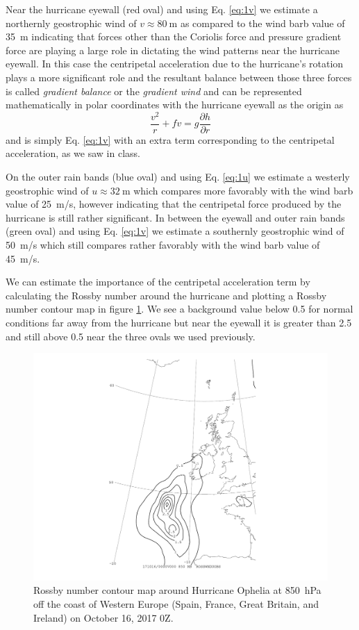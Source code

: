 \documentclass[11pt]{article}
\newcommand\p[2]{\frac{\partial #1}{\partial #2}}
\begin{document}
Near the hurricane eyewall (red oval) and using Eq. \ref{eq:1v} we estimate a northernly geostrophic wind of $v \approx \SI{80}{\m}$ as compared to the wind barb value of \SI{35}{\m} indicating that forces other than the Coriolis force and pressure gradient force are playing a large role in dictating the wind patterns near the hurricane eyewall. In this case the centripetal acceleration due to the hurricane's rotation plays a more significant role and the resultant balance between those three forces is called \emph{gradient balance} or the \emph{gradient wind} and can be represented mathematically in polar coordinates with the hurricane eyewall as the origin as
\begin{equation*}
	\frac{v^2}{r} + fv = g\p{h}{r}
\end{equation*}
and is simply Eq. \eqref{eq:1v} with an extra term corresponding to the centripetal acceleration, as we saw in class.

On the outer rain bands (blue oval) and using Eq. \ref{eq:1u} we estimate a westerly geostrophic wind of $u \approx \SI{32}{\m}$ which compares more favorably with the wind barb value of \SI{25}{\m/\s}, however indicating that the centripetal force produced by the hurricane is still rather significant. In between the eyewall and outer rain bands (green oval) and using Eq. \ref{eq:1v} we estimate a southernly geostrophic wind of \SI{50}{\m/\s} which still compares rather favorably with the wind barb value of \SI{45}{\m/\s}.

We can estimate the importance of the centripetal acceleration term by calculating the Rossby number around the hurricane and plotting a Rossby number contour map in figure \ref{fig:ophelia_rossby}. We see a background value below 0.5 for normal conditions far away from the hurricane but near the eyewall it is greater than 2.5 and still above 0.5 near the three ovals we used previously.

\begin{figure}[h!]
	\centering
	\includegraphics[trim={3.5cm 1cm 3.5cm 0},clip,width=\textwidth]{850hPa_rossby_ophelia}
	\caption{Rossby number contour map around Hurricane Ophelia at \SI{850}{\hecto\Pa} off the coast of Western Europe (Spain, France, Great Britain, and Ireland) on October 16, 2017 0Z.}
	\label{fig:ophelia_rossby}
\end{figure}
\end{document}
